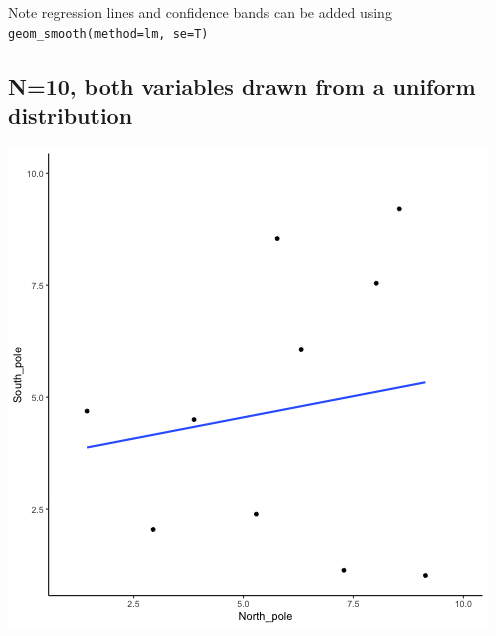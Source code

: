\documentclass[]{book}
\begin{document}
Note regression lines and confidence bands can be added using \texttt{geom\_smooth(method=lm,\ se=T)}

\hypertarget{n10-both-variables-drawn-from-a-uniform-distribution}{%
\subsection{N=10, both variables drawn from a uniform distribution}\label{n10-both-variables-drawn-from-a-uniform-distribution}}

\includegraphics{gifs/corUnifn10-1.gif}
\end{document}
